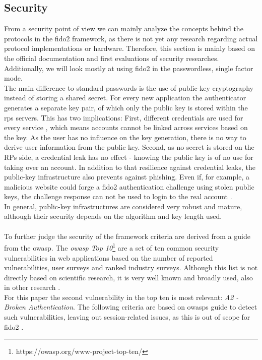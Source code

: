 \subsection{Security}
\label{subsec:security}

From a security point of view we can mainly analyze the concepts behind the protocols in the \ac{fido2} framework, as there is not yet any research regarding actual protocol implementations or hardware. Therefore, this section is mainly based on the official documentation and first evaluations of security researches. Additionally, we will look mostly at using \ac{fido2} in the passwordless, single factor mode.\\
The main difference to standard passwords is the use of public-key cryptography instead of storing a shared secret. For every new application the authenticator generates a separate key pair, of which only the public key is stored within the \acp{rp} servers. This has two implications: First, different credentials are used for every service \cite{mdn_webauthn,webauthn_standard}, which means accounts cannot be linked across services based on the key. As the user has no influence on the key generation, there is no way to derive user information from the public key. Second, as no secret is stored on the RPs side, a credential leak has no effect - knowing the public key is of no use for taking over an account. In addition to that resilience against credential leaks, the public-key infrastructure also prevents against phishing. Even if, for example, a malicious website could forge a \ac{fido2} authentication challenge using stolen public keys, the challenge response can not be used to login to the real account \cite{fido2_webauthn,fido2_overview}.\\
In general, public-key infrastructures are considered very robust and mature, although their security depends on the algorithm and key length used.\\
\\
To further judge the security of the framework criteria are derived from a guide from the \ac{owasp}. The \emph{\ac{owasp} Top 10}\footnote{https://owasp.org/www-project-top-ten/} are a set of ten common security vulnerabilities in web applications based on the number of reported vulnerabilities, user surveys and ranked industry surveys. Although this list is not directly based on scientific research, it is very well known and broadly used, also in other research \cite{rafique2015}.\\
For this paper the second vulnerability in the top ten is most relevant: \emph{A2 - Broken Authentication}. The following criteria are based on \acp{owasp} guide to detect such vulnerabilities, leaving out session-related issues, as this is out of scope for \ac{fido2} \cite{owasp_auth}.

